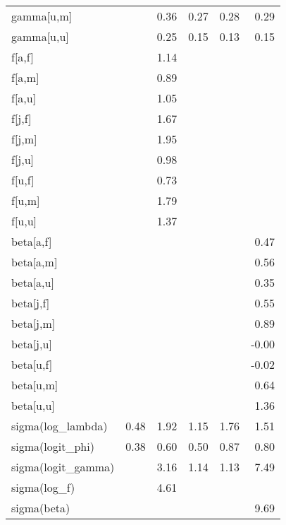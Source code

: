 \begin{table}[ht]
\begin{tabular}{lrrrrr}
  gamma[u,m] &  & 0.36 & 0.27 & 0.28 & 0.29 \\ 
  gamma[u,u] &  & 0.25 & 0.15 & 0.13 & 0.15 \\ 
  f[a,f] &  & 1.14 &  &  &  \\ 
  f[a,m] &  & 0.89 &  &  &  \\ 
  f[a,u] &  & 1.05 &  &  &  \\ 
  f[j,f] &  & 1.67 &  &  &  \\ 
  f[j,m] &  & 1.95 &  &  &  \\ 
  f[j,u] &  & 0.98 &  &  &  \\ 
  f[u,f] &  & 0.73 &  &  &  \\ 
  f[u,m] &  & 1.79 &  &  &  \\ 
  f[u,u] &  & 1.37 &  &  &  \\ 
  beta[a,f] &  &  &  &  & 0.47 \\ 
  beta[a,m] &  &  &  &  & 0.56 \\ 
  beta[a,u] &  &  &  &  & 0.35 \\ 
  beta[j,f] &  &  &  &  & 0.55 \\ 
  beta[j,m] &  &  &  &  & 0.89 \\ 
  beta[j,u] &  &  &  &  & -0.00 \\ 
  beta[u,f] &  &  &  &  & -0.02 \\ 
  beta[u,m] &  &  &  &  & 0.64 \\ 
  beta[u,u] &  &  &  &  & 1.36 \\ 
  sigma(log\_lambda) & 0.48 & 1.92 & 1.15 & 1.76 & 1.51 \\ 
  sigma(logit\_phi) & 0.38 & 0.60 & 0.50 & 0.87 & 0.80 \\ 
  sigma(logit\_gamma) &  & 3.16 & 1.14 & 1.13 & 7.49 \\ 
  sigma(log\_f) &  & 4.61 &  &  &  \\ 
  sigma(beta) &  &  &  &  & 9.69 \\ 
   \hline
\end{tabular}
\endgroup
\end{table}
